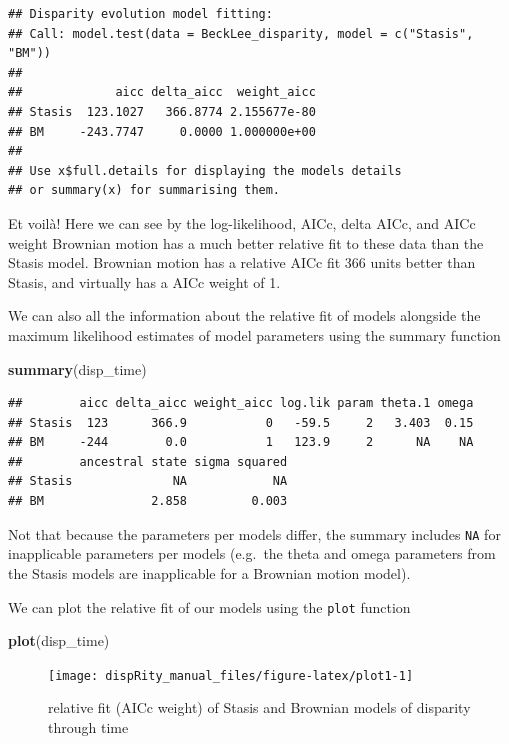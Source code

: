 \documentclass[]{book}
\newenvironment{Shaded}{\begin{snugshade}}{\end{snugshade}}
\newcommand{\KeywordTok}[1]{\textcolor[rgb]{0.13,0.29,0.53}{\textbf{#1}}}
\newcommand{\NormalTok}[1]{#1}
\theoremstyle{definition}
\theoremstyle{definition}
\theoremstyle{definition}
\theoremstyle{remark}
\begin{document}
\begin{verbatim}
## Disparity evolution model fitting:
## Call: model.test(data = BeckLee_disparity, model = c("Stasis", "BM")) 
## 
##             aicc delta_aicc  weight_aicc
## Stasis  123.1027   366.8774 2.155677e-80
## BM     -243.7747     0.0000 1.000000e+00
## 
## Use x$full.details for displaying the models details
## or summary(x) for summarising them.
\end{verbatim}

Et voilà! Here we can see by the log-likelihood, AICc, delta AICc, and
AICc weight Brownian motion has a much better relative fit to these data
than the Stasis model. Brownian motion has a relative AICc fit 366 units
better than Stasis, and virtually has a AICc weight of 1.

We can also all the information about the relative fit of models
alongside the maximum likelihood estimates of model parameters using the
summary function

\begin{Shaded}
\begin{Highlighting}[]
\KeywordTok{summary}\NormalTok{(disp_time)}
\end{Highlighting}
\end{Shaded}

\begin{verbatim}
##        aicc delta_aicc weight_aicc log.lik param theta.1 omega
## Stasis  123      366.9           0   -59.5     2   3.403  0.15
## BM     -244        0.0           1   123.9     2      NA    NA
##        ancestral state sigma squared
## Stasis              NA            NA
## BM               2.858         0.003
\end{verbatim}

Not that because the parameters per models differ, the summary includes
\texttt{NA} for inapplicable parameters per models (e.g.~the theta and
omega parameters from the Stasis models are inapplicable for a Brownian
motion model).

We can plot the relative fit of our models using the \texttt{plot}
function

\begin{Shaded}
\begin{Highlighting}[]
\KeywordTok{plot}\NormalTok{(disp_time)}
\end{Highlighting}
\end{Shaded}

\begin{figure}

{\centering \texttt{[image: dispRity\_manual\_files/figure-latex/plot1-1]} 

}

\caption{relative fit (AICc weight) of Stasis and Brownian models of disparity through time}\label{fig:plot1}
\end{figure}
\end{document}
